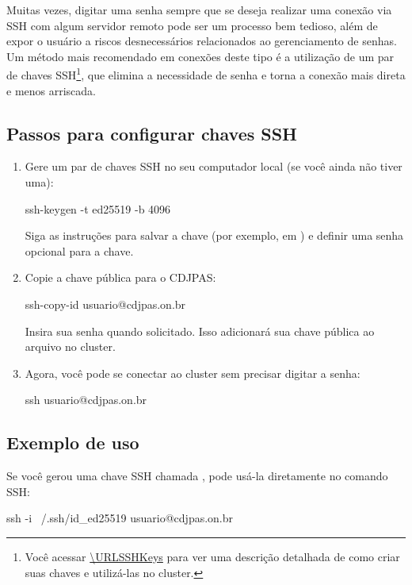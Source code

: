 Muitas vezes, digitar uma senha sempre que se deseja realizar uma conexão via SSH com algum servidor remoto pode ser um processo bem tedioso, além de expor o usuário a riscos desnecessários relacionados ao gerenciamento de senhas.
Um método mais recomendado em conexões deste tipo é a utilização de um par de chaves SSH\footnote{Você acessar \url{\URLSSHKeys} para ver uma descrição detalhada de como criar suas chaves e utilizá-las no cluster.}, que elimina a necessidade de senha e torna a conexão mais direta e menos arriscada.


\subsection{Passos para configurar chaves SSH}
\label{subsec:passos-para-configurar-chaves-SSH}

\begin{enumerate}
    \item Gere um par de chaves SSH no seu computador local (se você ainda não tiver uma):
    \begin{terminal}
        ssh-keygen -t ed25519 -b 4096
    \end{terminal}
        Siga as instruções para salvar a chave (por exemplo, em ) e definir uma senha opcional para a chave.

    \item Copie a chave pública para o CDJPAS:
    \begin{terminal}
        ssh-copy-id usuario@cdjpas.on.br
    \end{terminal}
        Insira sua senha quando solicitado. Isso adicionará sua chave pública ao arquivo  no cluster.

    \item Agora, você pode se conectar ao cluster sem precisar digitar a senha:
    \begin{terminal}
        ssh usuario@cdjpas.on.br
    \end{terminal}
\end{enumerate}

\subsection{Exemplo de uso}
\label{subsec:exemplo-de-uso}

Se você gerou uma chave SSH chamada , pode usá-la diretamente no comando SSH:
\begin{terminal}
    ssh -i ~/.ssh/id_ed25519 usuario@cdjpas.on.br
\end{terminal}



